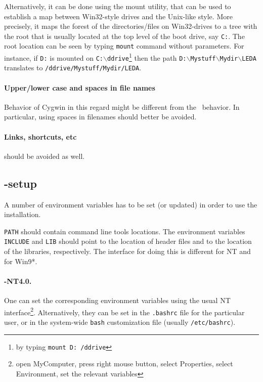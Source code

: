 Alternatively, it can be done using the mount utility, that can be
used to establish a map between Win32-style drives and the Unix-like
style. More precisely, it maps the forest of the directories/files on
Win32-drives to a tree with the root that is usually located at the top
level of the boot drive, say \texttt{C:}.  The root location can be
seen by typing \texttt{mount} command without parameters.  For
instance, if \texttt{D:} is mounted on
\texttt{C:$\backslash$ddrive}\footnote{by typing \texttt{mount D:
    /ddrive}} then the path
\texttt{D:$\backslash$Mystuff$\backslash$Mydir$\backslash$LEDA}
translates to \texttt{/ddrive/Mystuff/Mydir/LEDA}.

\paragraph{Upper/lower case and spaces in file names}
Behavior of Cygwin in this regard might be different from the \mswin\ 
behavior. In particular, using spaces in filenames should better be
avoided.

\paragraph{Links, shortcuts, etc} should be avoided as well.

\subsection{\msvc{}-setup}

A number of environment variables has to be set (or updated)
in order to use the installation.

\texttt{PATH} should contain \msvc{} command line tools locations.
The environment variables \texttt{INCLUDE} and \texttt{LIB} should
point to the location of \msvc{} header files and to the location of
the \msvc{} libraries, respectively.  The interface for doing this is
different for NT and for Win9*.

\paragraph{\mswin-NT4.0.}

One can set the corresponding environment variables using the
usual NT interface\footnote{open MyComputer, press right mouse button,
  select Properties, select Environment, set the relevant variables}.
Alternatively, they can be set in the \texttt{.bashrc} file for the
particular user, or in the system-wide \texttt{bash} customization
file (usually \texttt{/etc/bashrc}).

